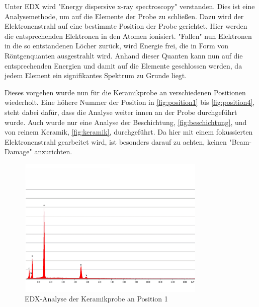 \documentclass[12pt,english,ngerman]{scrartcl}
\begin{document}
Unter EDX wird "Energy dispersive x-ray spectroscopy" verstanden. Dies ist eine Analysemethode, um auf die Elemente der 
Probe zu schließen. Dazu wird der Elektronenstrahl auf eine bestimmte Position der Probe gerichtet. Hier werden die
entsprechenden Elektronen in den Atomen ionisiert. "Fallen" nun Elektronen in die so entstandenen Löcher zurück, wird
Energie frei, die in Form von Röntgenquanten ausgestrahlt wird. Anhand dieser Quanten kann nun auf die entsprechenden
Energien und damit auf die Elemente geschlossen werden, da jedem Element ein signifikantes Spektrum zu Grunde liegt.


Dieses vorgehen wurde nun für die Keramikprobe an verschiedenen Positionen wiederholt. Eine höhere Nummer der Position
in \autoref{fig:position1} bis \autoref{fig:position4},
steht dabei dafür, dass die Analyse weiter innen an der Probe durchgeführt wurde. Auch wurde nur eine Analyse
der Beschichtung, \autoref{fig:beschichtung}, und von reinem Keramik, \autoref{fig:keramik}, durchgeführt.
Da hier mit einem fokussierten Elektronenstrahl gearbeitet wird, ist besonders darauf zu achten, keinen "Beam-Damage"
anzurichten.

\begin{figure}[H]
	\begin{center}
		\includegraphics[width =0.8\textwidth]{./figures/edx1.png}
	\end{center}
	\caption{EDX-Analyse der Keramikprobe an Position 1 \cite{sein_foto}}
    \label{fig:position1}
\end{figure}
\end{document}
